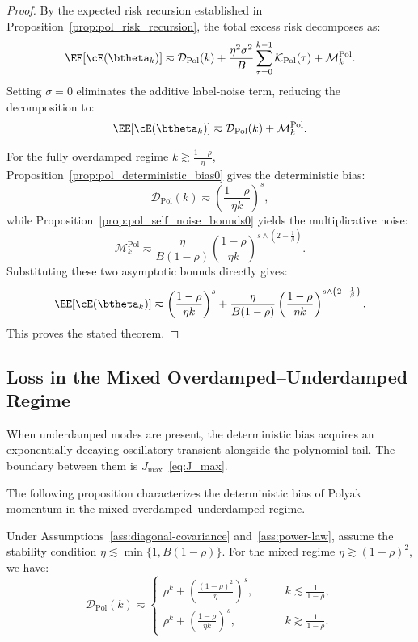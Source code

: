 \begin{proof}
By the expected risk recursion established in Proposition~\ref{prop:pol_risk_recursion}, the total excess risk decomposes as:
\[
    \EE[\cE(\btheta_k)]
    \eqsim
    \mathcal{D}_{\mathrm{Pol}}(k)
    +
    \frac{\eta^2\sigma^2}{B}\sum_{\tau=0}^{k-1}\mathcal{K}_{\mathrm{Pol}}(\tau)
    +
    \mathcal M_k^{\mathrm{Pol}}.
\]
Setting \(\sigma=0\) eliminates the additive label-noise term, reducing the decomposition to:
\[
    \EE[\cE(\btheta_k)]
    \eqsim
    \mathcal{D}_{\mathrm{Pol}}(k)
    +
    \mathcal M_k^{\mathrm{Pol}}.
\]

For the fully overdamped regime \(k \gtrsim \frac{1-\rho}{\eta}\), Proposition~\ref{prop:pol_deterministic_bias0} gives the deterministic bias:
\[
    \mathcal{D}_{\mathrm{Pol}}(k) \eqsim \left(\frac{1-\rho}{\eta k}\right)^s,
\]
while Proposition~\ref{prop:pol_self_noise_bounds0} yields the multiplicative noise:
\[
    \mathcal M_k^{\mathrm{Pol}}
    \eqsim
    \frac{\eta}{B(1-\rho)}
    \left(\frac{1-\rho}{\eta k}\right)^{s \wedge \left(2-\frac1\beta\right)}.
\]
Substituting these two asymptotic bounds directly gives:
\[
    \EE[\cE(\btheta_k)]
    \eqsim
    \left(\frac{1-\rho}{\eta k}\right)^s
    +
    \frac{\eta}{B(1-\rho)}
    \left(\frac{1-\rho}{\eta k}\right)^{s \wedge \left(2-\frac1\beta\right)}.
\]
This proves the stated theorem.
\end{proof}




\subsection{Loss in the Mixed Overdamped--Underdamped Regime}
\label{app:pol_mixed_loss}

When underdamped modes are present, the deterministic bias acquires an exponentially decaying oscillatory transient alongside the polynomial tail. The boundary between them is  $J_{\max}$~\ref{eq:J_max}.

The following proposition characterizes the deterministic bias of Polyak momentum in the mixed overdamped--underdamped regime.

\begin{proposition}
\label{prop:pol_deterministic_bias}
Under Assumptions~\ref{ass:diagonal-covariance} and~\ref{ass:power-law}, assume the stability condition
$\eta\lesssim \min\{1,B(1-\rho)\}$. For the mixed regime \(\eta\gtrsim(1-\rho)^2\), we have:
\begin{equation*}
    \mathcal{D}_{\mathrm{Pol}}(k)
    \eqsim
    \begin{cases}
    \rho^k+\left(\frac{(1-\rho)^2}{\eta}\right)^s, &\qquad k\lesssim\frac{1}{1-\rho},\\
    \rho^k+\left(\frac{1-\rho}{\eta k}\right)^s, &\qquad k\gtrsim\frac{1}{1-\rho}.
    \end{cases}
\end{equation*}
\end{proposition}

